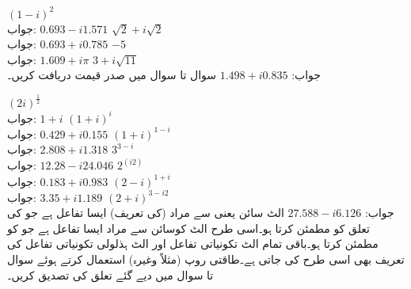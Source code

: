 \quad 
$(1-i)^2$\\
جواب:\quad
$0.693-i1.571$
\quad 
$\sqrt{2}+i\sqrt{2}$\\
جواب:\quad
$0.693+i0.785$
\quad 
$-5$\\
جواب:\quad
$1.609+i\pi$
\quad 
$3+i\sqrt{11}$\\
جواب:\quad
$1.498+i0.835$
سوال  تا سوال  میں صدر قیمت دریافت کریں۔

\quad
$(2i)^{\tfrac{1}{2}}$\\
جواب:\quad
$1+i$
\quad
$(1+i)^i$\\
جواب:\quad
$0.429+i0.155$
\quad
$(1+i)^{1-i}$\\
جواب:\quad
$2.808+i1.318$
\quad
$3^{3-i}$\\
جواب:\quad
$12.28-i24.046$
\quad
$2^(i2)$\\
جواب:\quad
$0.183+i0.983$
\quad
$(2-i)^{1+i}$\\
جواب:\quad
$3.35+i1.189$
\quad
$(2+i)^{3-i2}$\\
جواب:\quad
$27.588-i6.126$
الٹ سائن یعنی  سے مراد (کی تعریف) ایسا تفاعل ہے جو  کی تعلق کو مطمئن کرتا ہو۔اسی طرح الٹ کوسائن  سے مراد ایسا تفاعل ہے جو  کو مطمئن کرتا ہو۔باقی تمام الٹ تکونیاتی تفاعل اور الٹ ہذلولی تکونیاتی تفاعل کی تعریف بھی اسی طرح کی جاتی ہے۔طاقتی روپ (مثلاً  وغیرہ) استعمال کرتے ہوئے سوال  تا سوال  میں دیے گئے تعلق کی تصدیق کریں۔

